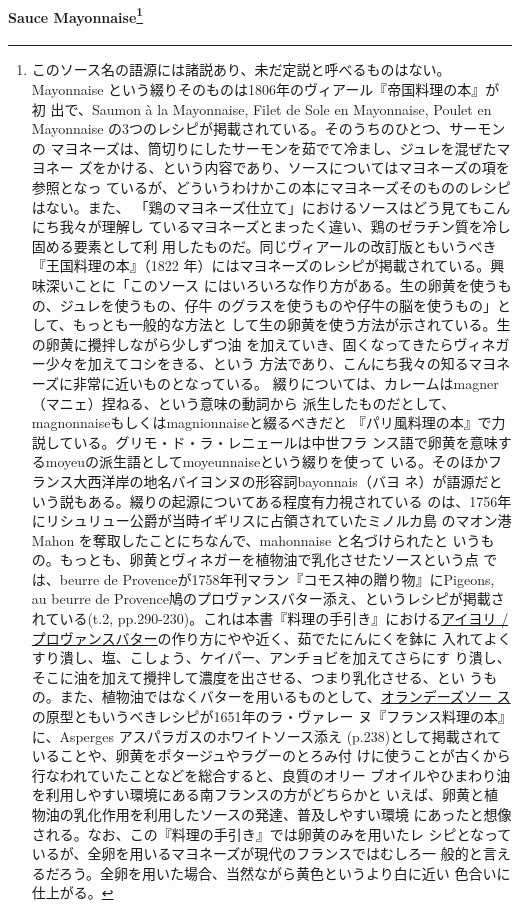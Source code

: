\begin{recette}
{\paragraph[Sauce Mayonnaise]{\texorpdfstring{Sauce Mayonnaise\footnote{このソース名の語源には諸説あり、未だ定説と呼べるものはない。
  Mayonnaise という綴りそのものは1806年のヴィアール『帝国料理の本』が初
  出で、Saumon à la Mayonnaise, Filet de Sole en Mayonnaise, Poulet en
  Mayonnaise の3つのレシピが掲載されている。そのうちのひとつ、サーモンの
  マヨネーズは、筒切りにしたサーモンを茹でて冷まし、ジュレを混ぜたマヨネー
  ズをかける、という内容であり、ソースについてはマヨネーズの項を参照となっ
  ているが、どういうわけかこの本にマヨネーズそのもののレシピはない。また、
  「鶏のマヨネーズ仕立て」におけるソースはどう見てもこんにち我々が理解し
  ているマヨネーズとまったく違い、鶏のゼラチン質を冷し固める要素として利
  用したものだ。同じヴィアールの改訂版ともいうべき『王国料理の本』（1822
  年）にはマヨネーズのレシピが掲載されている。興味深いことに「このソース
  にはいろいろな作り方がある。生の卵黄を使うもの、ジュレを使うもの、仔牛
  のグラスを使うものや仔牛の脳を使うもの」として、もっとも一般的な方法と
  して生の卵黄を使う方法が示されている。生の卵黄に攪拌しながら少しずつ油
  を加えていき、固くなってきたらヴィネガー少々を加えてコシをきる、という
  方法であり、こんにち我々の知るマヨネーズに非常に近いものとなっている。
  綴りについては、カレームはmagner（マニェ）捏ねる、という意味の動詞から
  派生したものだとして、magnonnaiseもしくはmagnionnaiseと綴るべきだと
  『パリ風料理の本』で力説している。グリモ・ド・ラ・レニェールは中世フラ
  ンス語で卵黄を意味するmoyeuの派生語としてmoyeunnaiseという綴りを使って
  いる。そのほかフランス大西洋岸の地名バイヨンヌの形容詞bayonnais（バヨ
  ネ）が語源だという説もある。綴りの起源についてある程度有力視されている
  のは、1756年にリシュリュー公爵が当時イギリスに占領されていたミノルカ島
  のマオン港 Mahon を奪取したことにちなんで、mahonnaise と名づけられたと
  いうもの。もっとも、卵黄とヴィネガーを植物油で乳化させたソースという点
  では、beurre de Provenceが1758年刊マラン『コモス神の贈り物』にPigeons,
  au beurre de Provence鳩のプロヴァンスバター添え、というレシピが掲載さ
  れている(t.2,
  pp.290-230)。これは本書『料理の手引き』における\protect\hyperlink{aioli}{アイヨリ
  / プロヴァンスバター}の作り方にやや近く、茹でたにんにくを鉢に
  入れてよくすり潰し、塩、こしょう、ケイパー、アンチョビを加えてさらにす
  り潰し、そこに油を加えて攪拌して濃度を出させる、つまり乳化させる、とい
  うもの。また、植物油ではなくバターを用いるものとして、\protect\hyperlink{sauce-hollandaise}{オランデーズソー
  ス}の原型ともいうべきレシピが1651年のラ・ヴァレー
  ヌ『フランス料理の本』に、Asperges アスパラガスのホワイトソース添え
  (p.238)として掲載されていることや、卵黄をポタージュやラグーのとろみ付
  けに使うことが古くから行なわれていたことなどを総合すると、良質のオリー
  ブオイルやひまわり油を利用しやすい環境にある南フランスの方がどちらかと
  いえば、卵黄と植物油の乳化作用を利用したソースの発達、普及しやすい環境
  にあったと想像される。なお、この『料理の手引き』では卵黄のみを用いたレ
  シピとなっているが、全卵を用いるマヨネーズが現代のフランスではむしろ一
  般的と言えるだろう。全卵を用いた場合、当然ながら黄色というより白に近い
  色合いに仕上がる。}}{Sauce Mayonnaise}}\label{mayonnaise}}


\end{recette}
